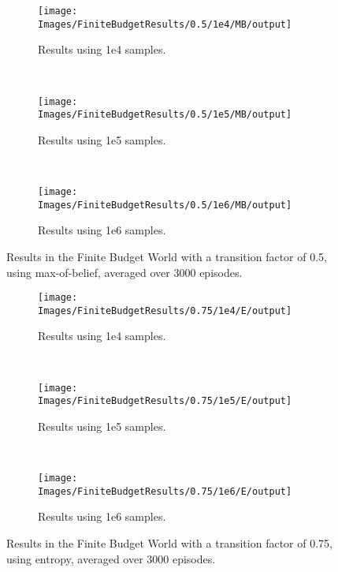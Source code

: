 \begin{figure}[ht]
        \centering
        \begin{subfigure}[t]{0.3\textwidth}
                \texttt{[image: Images/FiniteBudgetResults/0.5/1e4/MB/output]}
                \caption{Results using 1e4 samples.}
                \label{fig:fb4m5}
        \end{subfigure}%
        ~ %
        \begin{subfigure}[t]{0.3\textwidth}
                \texttt{[image: Images/FiniteBudgetResults/0.5/1e5/MB/output]}
                \caption{Results using 1e5 samples.}
                \label{fig:fb5m5}
        \end{subfigure}
        ~ %
        \begin{subfigure}[t]{0.3\textwidth}
                \texttt{[image: Images/FiniteBudgetResults/0.5/1e6/MB/output]}
                \caption{Results using 1e6 samples.}
                \label{fig:fb6m5}
        \end{subfigure}
        \caption{Results in the Finite Budget World with a transition factor of 0.5, using max-of-belief, averaged over 3000 episodes.}
        \label{ref:fbmbfig5}
\end{figure}

\begin{figure}[ht]
        \centering
        \begin{subfigure}[t]{0.3\textwidth}
                \texttt{[image: Images/FiniteBudgetResults/0.75/1e4/E/output]}
                \caption{Results using 1e4 samples.}
                \label{fig:fb4e75}
        \end{subfigure}%
        ~ %
        \begin{subfigure}[t]{0.3\textwidth}
                \texttt{[image: Images/FiniteBudgetResults/0.75/1e5/E/output]}
                \caption{Results using 1e5 samples.}
                \label{fig:fb5e75}
        \end{subfigure}
        ~ %
        \begin{subfigure}[t]{0.3\textwidth}
                \texttt{[image: Images/FiniteBudgetResults/0.75/1e6/E/output]}
                \caption{Results using 1e6 samples.}
                \label{fig:fb6e75}
        \end{subfigure}
        \caption{Results in the Finite Budget World with a transition factor of 0.75, using entropy, averaged over 3000 episodes.}
        \label{ref:fbentropyfig75}
\end{figure}

